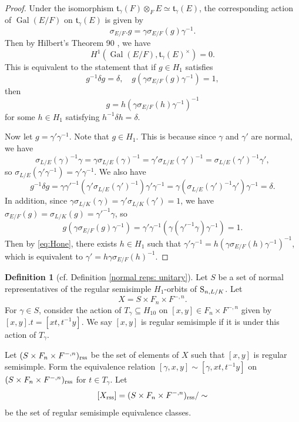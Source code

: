 \documentclass[11pt, reqno]{amsart}
\numberwithin{equation}{subsection}
\theoremstyle{plain}
\theoremstyle{definition}
\newtheorem{definition}[proposition]{Definition}
\renewcommand{\S}{\textnormal{S}}
\DeclareMathOperator{\Gal}{Gal}
\newcommand{\rss}{\textnormal{rss}}
\begin{document}
\begin{proof}
Under the isomorphism $\mathfrak t_\gamma(F)
\otimes_F E \simeq \mathfrak t_\gamma(E)$,
the corresponding action of $\Gal(E/F)$ on
$\mathfrak t_\gamma(E)$ is given by
\[
    \sigma_{E/F}.g = \gamma \sigma_{E/F}(g) \gamma^{-1}.
\]
Then by Hilbert's Theorem 90 
\cite[Chapter~X,~Section~1,~Exercise~2]{Serre-local}, 
we have 
\begin{equation}
\label{eq:Hone}
    H^1(\Gal(E/F), \mathfrak t_\gamma(E)^\times) = 0.
\end{equation}
This is equivalent to the statement that if
$g \in H_1$ satisfies
\[
    g^{-1}\delta g = \delta, \quad
    g(\gamma \sigma_{E/F}(g) \gamma^{-1}) = 1,
\]
then 
\[
    g = h(\gamma \sigma_{E/F}(h) \gamma^{-1})^{-1}
\]
for some $h \in H_1$ satisfying $h^{-1}\delta h = \delta$.

Now let $g = \gamma'\gamma^{-1}$. Note that
$g \in H_1$. This is because since $\gamma$ and $\gamma'$ are normal, we have
\[
    \sigma_{L/E}(\gamma)^{-1}\gamma
    = \gamma\sigma_{L/E}(\gamma)^{-1} 
    = \gamma'\sigma_{L/E}(\gamma')^{-1}
    = \sigma_{L/E}(\gamma')^{-1}\gamma',
\]
so $\sigma_{L/E}(\gamma'\gamma^{-1})
= \gamma'\gamma^{-1}$. 
We also have 
\[
    g^{-1}\delta g 
    = \gamma\gamma'^{-1}
    (\gamma'\sigma_{L/E}(\gamma')^{-1}) \gamma'\gamma^{-1}
    = \gamma (\sigma_{L/E}(\gamma')^{-1}\gamma')
    \gamma^{-1}
    = \delta.
\]
In addition, since $\gamma\sigma_{L/K}(\gamma) = \gamma'\sigma_{L/K}(\gamma') = 1$,
we have $\sigma_{E/F}(g) = \sigma_{L/K}(g)
= \gamma'^{-1}\gamma$, so
\[
    g(\gamma \sigma_{E/F}(g) \gamma^{-1})
    = \gamma'\gamma^{-1} (\gamma (\gamma'^{-1}\gamma)\gamma^{-1}) = 1.
\]
Then by \eqref{eq:Hone}, there exists 
$h \in H_1$ such that
$\gamma'\gamma^{-1} = h(\gamma \sigma_{E/F}(h) \gamma^{-1})^{-1}$, which is equivalent to
$\gamma' = h \gamma \sigma_{E/F}(h)^{-1}$.
\qedhere
\end{proof}


\begin{definition}[cf. Definition \ref{normal reps: unitary}]  \label{normal reps: GL side}
Let $S$ be a set of normal representatives
of the regular semisimple $H_1$-orbits
of $\S_{n,L/K}$. Let 
\[
    X = S \times F_n \times F^{-,n}.
\]
For $\gamma \in S$, consider the action of $T_\gamma \subseteq H_{10}$ on
$[x, y] \in F_n \times F^{-,n}$ given by
$[x, y].t = [xt, t^{-1} y]$.
We say $[x, y]$ is regular semisimple if it is under this
action of $T_\gamma$.

Let $(S \times F_n \times F^{-,n})_\rss$ be the set of elements of $X$
such that $[x, y]$ is regular semisimple. Form the equivalence relation
$[\gamma, x, y] \sim [\gamma, xt, t^{-1}y]$ on $(S \times F_n \times F^{-,n})_\rss$ 
for $t \in T_\gamma$.
Let 
\[
    [X_\rss] = (S \times F_n \times F^{-,n})_\rss/\sim
\]
be the set of regular semisimple equivalence classes.
\end{definition}
\end{document}
